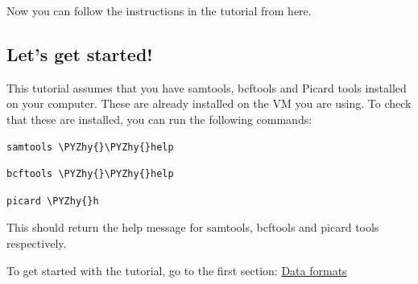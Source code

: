 \documentclass[11pt]{article}
\makeatletter
\def\PYZhy{\char`\-}
\newcommand{\boxspacing}{\kern\kvtcb@left@rule\kern\kvtcb@boxsep}
\newcommand{\prompt}[4]{
        {\ttfamily\llap{{\color{#2}[#3]:\hspace{3pt}#4}}\vspace{-\baselineskip}}
    }
\makeatother
\begin{document}
    Now you can follow the instructions in the tutorial from here.

\hypertarget{lets-get-started}{%
\subsection{Let's get started!}\label{lets-get-started}}

This tutorial assumes that you have samtools, bcftools and Picard tools
installed on your computer. These are already installed on the VM you
are using. To check that these are installed, you can run the following
commands:

    \begin{tcolorbox}[breakable, size=fbox, boxrule=1pt, pad at break*=1mm,colback=cellbackground, colframe=cellborder]
\prompt{In}{incolor}{ }{\boxspacing}
\begin{Verbatim}[commandchars=\\\{\}]
samtools \PYZhy{}\PYZhy{}help
\end{Verbatim}
\end{tcolorbox}

    \begin{tcolorbox}[breakable, size=fbox, boxrule=1pt, pad at break*=1mm,colback=cellbackground, colframe=cellborder]
\prompt{In}{incolor}{ }{\boxspacing}
\begin{Verbatim}[commandchars=\\\{\}]
bcftools \PYZhy{}\PYZhy{}help
\end{Verbatim}
\end{tcolorbox}

    \begin{tcolorbox}[breakable, size=fbox, boxrule=1pt, pad at break*=1mm,colback=cellbackground, colframe=cellborder]
\prompt{In}{incolor}{ }{\boxspacing}
\begin{Verbatim}[commandchars=\\\{\}]
picard \PYZhy{}h
\end{Verbatim}
\end{tcolorbox}

    This should return the help message for samtools, bcftools and picard
tools respectively.

To get started with the tutorial, go to the first section:
\href{formats.ipynb}{Data formats}





\newpage
\end{document}
